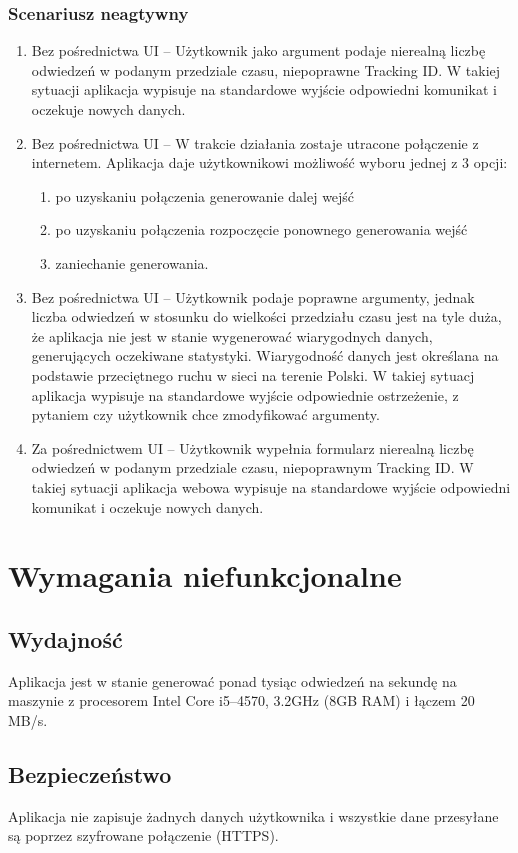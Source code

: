 \documentclass{article}
\begin{document}
\subsubsection{Scenariusz neagtywny}
\begin{enumerate}
\item Bez pośrednictwa UI – Użytkownik jako argument podaje nierealną liczbę odwiedzeń w podanym przedziale czasu, niepoprawne Tracking ID\@. W takiej sytuacji aplikacja wypisuje na standardowe wyjście odpowiedni komunikat i oczekuje nowych danych.

\item Bez pośrednictwa UI – W trakcie działania zostaje utracone połączenie z internetem. Aplikacja daje użytkownikowi możliwość wyboru jednej z 3 opcji:
\begin{enumerate}
\item po uzyskaniu połączenia generowanie dalej wejść
\item po uzyskaniu połączenia rozpoczęcie ponownego generowania wejść
\item zaniechanie generowania.
\end{enumerate}

\item Bez pośrednictwa UI – Użytkownik podaje poprawne argumenty, jednak liczba odwiedzeń w stosunku do wielkości przedziału czasu jest na tyle duża, że aplikacja nie jest w stanie wygenerować wiarygodnych danych, generujących oczekiwane statystyki. Wiarygodność danych jest określana na podstawie przeciętnego ruchu w sieci na terenie Polski. W takiej sytuacj aplikacja wypisuje na standardowe wyjście odpowiednie ostrzeżenie, z pytaniem czy użytkownik chce zmodyfikować argumenty.

\item Za pośrednictwem UI – Użytkownik wypełnia formularz nierealną liczbę odwiedzeń w podanym przedziale czasu, niepoprawnym Tracking ID\@. W takiej sytuacji aplikacja webowa wypisuje na standardowe wyjście odpowiedni komunikat i oczekuje nowych danych.


\end{enumerate}

\section{Wymagania niefunkcjonalne}

\subsection{Wydajność}
Aplikacja jest w stanie generować ponad tysiąc odwiedzeń na sekundę na maszynie z procesorem Intel Core i5--4570, 3.2GHz (8GB RAM) i łączem 20 MB/s.

\subsection{Bezpieczeństwo}
Aplikacja nie zapisuje żadnych danych użytkownika i wszystkie dane przesyłane są poprzez szyfrowane połączenie (HTTPS).
\end{document}
